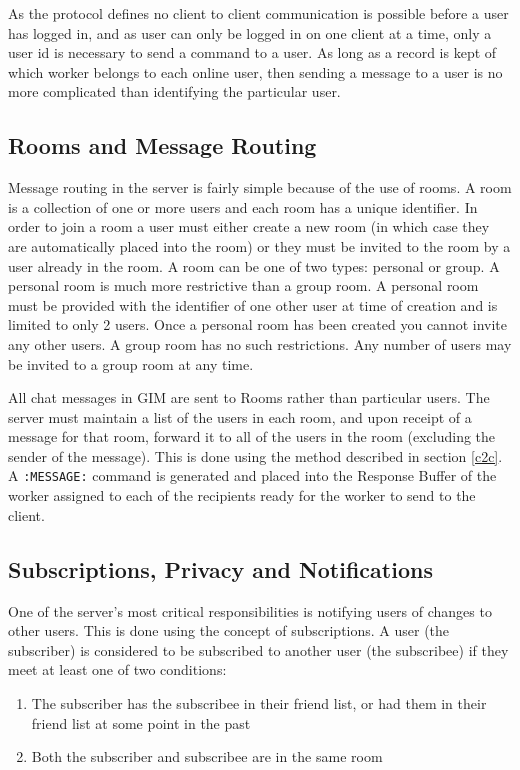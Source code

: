 As the protocol defines no client to client communication is possible before a user has logged in, and as user can only be logged in on one client at a time, only a user id is necessary to send a command to a user. As long as a record is kept of which worker belongs to each online user, then sending a message to a user is no more complicated than identifying the particular user.

\subsection{Rooms and Message Routing}
\label{message_routing}

Message routing in the server is fairly simple because of the use of rooms. A room is a collection of one or more users and each room has a unique identifier. In order to join a room a user must either create a new room (in which case they are automatically placed into the room) or they must be invited to the room by a user already in the room. A room can be one of two types: personal or group. A personal room is much more restrictive than a group room. A personal room must be provided with the identifier of one other user at time of creation and is limited to only 2 users. Once a personal room has been created you cannot invite any other users. A group room has no such restrictions. Any number of users may be invited to a group room at any time.

All chat messages in GIM are sent to Rooms rather than particular users. The server must maintain a list of the users in each room, and upon receipt of a message for that room, forward it to all of the users in the room (excluding the sender of the message). This is done using the method described in section \ref{c2c}. A \texttt{:MESSAGE:} command is generated and placed into the Response Buffer of the worker assigned to each of the recipients ready for the worker to send to the client.

\subsection{Subscriptions, Privacy and Notifications}
One of the server's most critical responsibilities is notifying users of changes to other users. This is done using the concept of subscriptions. A user (the subscriber) is considered to be subscribed to another user (the subscribee) if they meet at least one of two conditions:

\begin{enumerate}
\item{The subscriber has the subscribee in their friend list, or had them in their friend list at some point in the past}
\item{Both the subscriber and subscribee are in the same room}
\end{enumerate}

